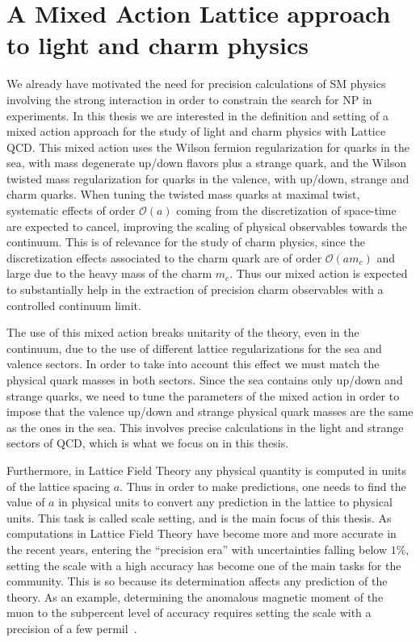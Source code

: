 \section*{A Mixed Action Lattice approach to light and charm physics}

We already have motivated the need for precision calculations of SM physics involving the strong interaction in order to constrain the search for NP in experiments. In this thesis we are interested in the definition and setting of a mixed action approach for the study of light and charm physics with Lattice QCD. This mixed action uses the Wilson fermion regularization for quarks in the sea, with mass degenerate up/down flavors plus a strange quark, and the Wilson twisted mass regularization for quarks in the valence, with up/down, strange and charm quarks. When tuning the twisted mass quarks at maximal twist, systematic effects of order $\mathcal{O}(a)$ coming from the discretization of space-time are expected to cancel, improving the scaling of physical observables towards the continuum. This is of relevance for the study of charm physics, since the discretization effects associated to the charm quark are of order $\mathcal{O}(am_c)$ and large due to the heavy mass of the charm $m_c$. Thus our mixed action is expected to substantially help in the extraction of precision charm observables with a controlled continuum limit.

The use of this mixed action breaks unitarity of the theory, even in the continuum, due to the use of different lattice regularizations for the sea and valence sectors. In order to take into account this effect we must match the physical quark masses in both sectors. Since the sea contains only up/down and strange quarks, we need to tune the parameters of the mixed action in order to impose that the valence up/down and strange physical quark masses are the same as the ones in the sea. This involves precise calculations in the light and strange sectors of QCD, which is what we focus on in this thesis.

Furthermore, in Lattice Field Theory any physical quantity is computed in units of the lattice spacing $a$. Thus in order to make predictions, one needs to find the value of $a$ in physical units to convert any prediction in the lattice to physical units. This task is called scale setting, and is the main focus of this thesis. As computations in Lattice Field Theory have become more and more accurate in the recent years, entering the ``precision era'' with uncertainties falling below $1\%$, setting the scale with a high accuracy has become one of the main tasks for the community. This is so because its determination affects any prediction of the theory. As an example, determining the anomalous magnetic moment of the muon to the subpercent level of accuracy requires setting the scale with a precision of a few permil~\citep{Borsanyi:2020mff}.

